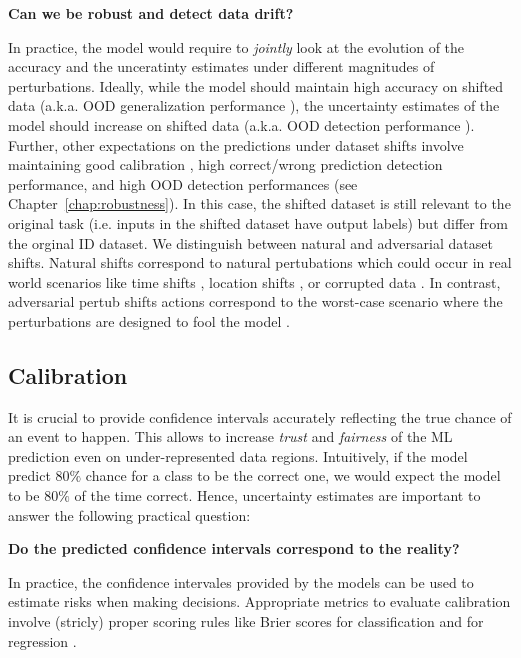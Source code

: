 \begin{center}
    \textbf{Can we be robust and detect data drift?}
\end{center}

In practice, the model would require to \emph{jointly} look at the evolution of the accuracy and the unceratinty estimates under different magnitudes of perturbations. Ideally, while the model should maintain high accuracy on shifted data (a.k.a. OOD generalization performance ), the uncertainty estimates of the model should increase on shifted data (a.k.a. OOD detection performance ). Further, other expectations on the predictions under dataset shifts involve maintaining good calibration \cite{dataset-shift}, high correct/wrong prediction detection performance, and high OOD detection performances (see Chapter~\ref{chap:robustness}). In this case, the shifted dataset is still relevant to the original task (i.e. inputs in the shifted dataset have output labels) but differ from the orginal ID dataset. We distinguish between natural and adversarial dataset shifts. Natural shifts correspond to natural pertubations which could occur in real world scenarios like time shifts , location shifts , or corrupted data . In contrast, adversarial pertub shifts actions correspond to the worst-case scenario where the perturbations are designed to fool the model .

\subsection{Calibration}

It is crucial to provide confidence intervals accurately reflecting the true chance of an event to happen. This allows to increase \emph{trust} and \emph{fairness} of the ML prediction even on under-represented data regions. Intuitively, if the model predict $80\%$ chance for a class to be the correct one, we would expect the model to be $80\%$ of the time correct. Hence, uncertainty estimates are important to answer the following practical question:

\begin{center}
    \textbf{Do the predicted confidence intervals correspond to the reality?}
\end{center}

In practice, the confidence intervales provided by the models can be used to estimate risks when making decisions. Appropriate metrics to evaluate calibration involve (stricly) proper scoring rules like Brier scores for classification and  for regression .